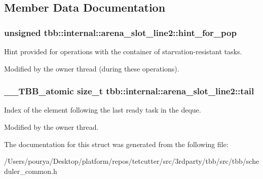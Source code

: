 \subsection{Member Data Documentation}
\hypertarget{structtbb_1_1internal_1_1arena__slot__line2_aa8508e7c5d0b7525f356ac63dbc22427}{}
\subsubsection[{hint\+\_\+for\+\_\+pop}]{\setlength{\rightskip}{0pt plus 5cm}unsigned tbb\+::internal\+::arena\+\_\+slot\+\_\+line2\+::hint\+\_\+for\+\_\+pop}\label{structtbb_1_1internal_1_1arena__slot__line2_aa8508e7c5d0b7525f356ac63dbc22427}


Hint provided for operations with the container of starvation-\/resistant tasks. 

Modified by the owner thread (during these operations). \hypertarget{structtbb_1_1internal_1_1arena__slot__line2_af3e2089ebb470604941ca8db193d9927}{}
\subsubsection[{tail}]{\setlength{\rightskip}{0pt plus 5cm}\+\_\+\+\_\+\+T\+B\+B\+\_\+atomic size\+\_\+t tbb\+::internal\+::arena\+\_\+slot\+\_\+line2\+::tail}\label{structtbb_1_1internal_1_1arena__slot__line2_af3e2089ebb470604941ca8db193d9927}


Index of the element following the last ready task in the deque. 

Modified by the owner thread. 

The documentation for this struct was generated from the following file\+:\begin{DoxyCompactItemize}
\item 
/\+Users/pourya/\+Desktop/platform/repos/tetcutter/src/3rdparty/tbb/src/tbb/scheduler\+\_\+common.\+h\end{DoxyCompactItemize}
